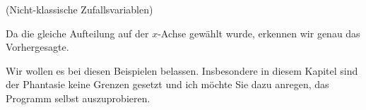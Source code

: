 \begin{Beispiel}{(Nicht-klassische Zufallsvariablen)}
\begin{enumerate}[label=(\roman*)]
Da die gleiche Aufteilung auf der $x$-Achse gewählt wurde, erkennen wir genau das Vorhergesagte.
\end{enumerate}
Wir wollen es bei diesen Beispielen belassen. Insbesondere in diesem Kapitel sind der Phantasie keine Grenzen gesetzt und ich möchte Sie dazu anregen, das Programm selbst auszuprobieren.
\end{Beispiel}